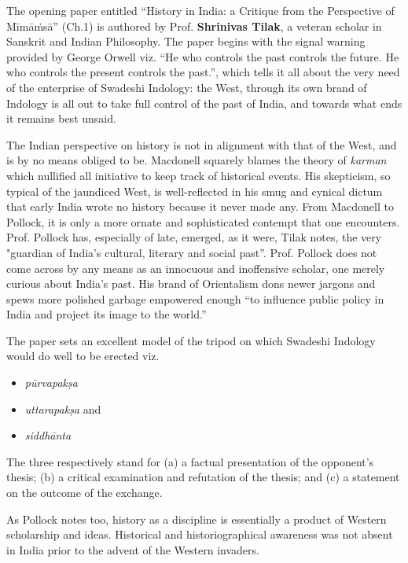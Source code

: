 The opening paper entitled “History in India: a Critique from the Perspective of Mīmāṁsā” (Ch.1) is authored by Prof. \textbf{Shrinivas Tilak}, a veteran scholar in Sanskrit and Indian Philosophy. The paper begins with the signal warning provided by George Orwell viz. “He who controls the past controls the future. He who controls the present controls the past.”, which tells it all about the very need of the enterprise of Swadeshi Indology: the West, through its own brand of Indology is all out to take full control of the past of India, and towards what ends it remains best unsaid. 

The Indian perspective on history is not in alignment with that of the West, and is by no means obliged to be. Macdonell squarely blames the theory of \textit{karman} which nullified all initiative to keep track of historical events. His skepticism, so typical of the jaundiced West, is well-reflected in his smug and cynical dictum that early India wrote no history because it never made any. From Macdonell to Pollock, it is only a more ornate and sophisticated contempt that one encounters. Prof. Pollock has, especially of late, emerged, as it were, Tilak notes, the very "guardian of India’s cultural, literary and social past”. Prof. Pollock does not come across by any means as an innocuous and inoffensive scholar, one merely curious about India’s past. His brand of Orientalism dons newer jargons and spews more polished garbage empowered enough “to influence public policy in India and project its image to the world.”

The paper sets an excellent model of the tripod on which Swadeshi Indology would do well to be erected viz.

\begin{itemize}
\item \textit{pūrvapakṣa}

 \item \textit{uttarapakṣa} and 

 \item \textit{siddhānta}

\end{itemize}

The three respectively stand for (a) a factual presentation of the opponent’s thesis; (b) a critical examination and refutation of the thesis; and (c) a statement on the outcome of the exchange. 

As Pollock notes too, history as a discipline is essentially a product of Western scholarship and ideas. Historical and historiographical awareness was not absent in India prior to the advent of the Western invaders. 

